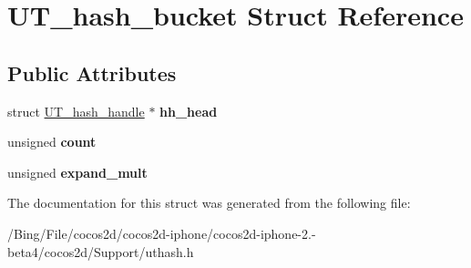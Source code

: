 \hypertarget{struct_u_t__hash__bucket}{\section{U\-T\-\_\-hash\-\_\-bucket Struct Reference}
\label{struct_u_t__hash__bucket}
}
\subsection*{Public Attributes}
\begin{DoxyCompactItemize}
\item 
\hypertarget{struct_u_t__hash__bucket_a785a785132212378bb28fb4341cfecaf}{struct \hyperlink{struct_u_t__hash__handle}{U\-T\-\_\-hash\-\_\-handle} $\ast$ {\bfseries hh\-\_\-head}}\label{struct_u_t__hash__bucket_a785a785132212378bb28fb4341cfecaf}

\item 
\hypertarget{struct_u_t__hash__bucket_a5d20cc12bdcbde360398910eefb45634}{unsigned {\bfseries count}}\label{struct_u_t__hash__bucket_a5d20cc12bdcbde360398910eefb45634}

\item 
\hypertarget{struct_u_t__hash__bucket_a9b739c1b69c141e8198c0c64af643b2b}{unsigned {\bfseries expand\-\_\-mult}}\label{struct_u_t__hash__bucket_a9b739c1b69c141e8198c0c64af643b2b}

\end{DoxyCompactItemize}


The documentation for this struct was generated from the following file\-:\begin{DoxyCompactItemize}
\item 
/\-Bing/\-File/cocos2d/cocos2d-\/iphone/cocos2d-\/iphone-\/2.-\/beta4/cocos2d/\-Support/uthash.\-h\end{DoxyCompactItemize}
